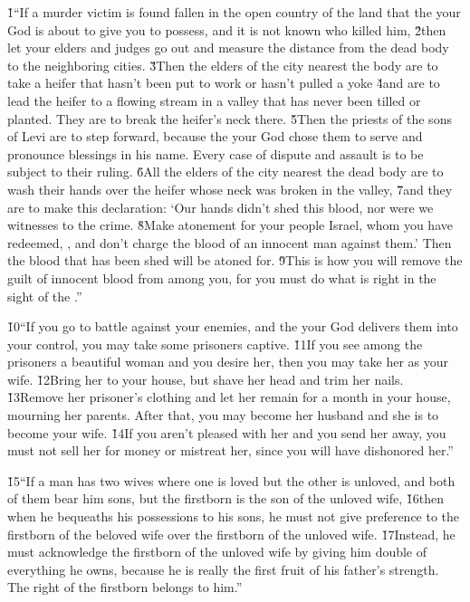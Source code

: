 \v{1}``If a murder victim is found fallen in the open country of the land that the  your God is about to give you to possess, and it is not known who killed him, \v{2}then let your elders and judges go out and measure the distance from the dead body to the neighboring cities. \v{3}Then the elders of the city nearest the body are to take a heifer that hasn't been put to work or hasn't pulled a yoke \v{4}and are to lead the heifer to a flowing stream in a valley that has never been tilled or planted. They are to break the heifer's neck there. \v{5}Then the priests of the sons of Levi are to step forward, because the  your God chose them to serve and pronounce blessings in his name. Every case of dispute and assault is to be subject to their ruling. \v{6}All the elders of the city nearest the dead body are to wash their hands over the heifer whose neck was broken in the valley, \v{7}and they are to make this declaration: `Our hands didn't shed this blood, nor were we witnesses to the crime. \v{8}Make atonement for your people Israel, whom you have redeemed, , and don't charge the blood of an innocent man against them.' Then the blood that has been shed will be atoned for. \v{9}This is how you will remove the guilt of innocent blood from among you, for you must do what is right in the sight of the .''

\v{10}``If you go to battle against your enemies, and the  your God delivers them into your control, you may take some prisoners captive. \v{11}If you see among the prisoners a beautiful woman and you desire her, then you may take her as your wife. \v{12}Bring her to your house, but shave her head and trim her nails. \v{13}Remove her prisoner's clothing and let her remain for a month in your house, mourning her parents. After that, you may become her husband and she is to become your wife. \v{14}If you aren't pleased with her and you send her away, you must not sell her for money or mistreat her, since you will have dishonored her.''

\v{15}``If a man has two wives where one is loved but the other is unloved, and both of them bear him sons, but the firstborn is the son of the unloved wife, \v{16}then when he bequeaths his possessions to his sons, he must not give preference to the firstborn of the beloved wife over the firstborn of the unloved wife. \v{17}Instead, he must acknowledge the firstborn of the unloved wife by giving him double of everything he owns, because he is really the first fruit of his father's strength. The right of the firstborn belongs to him.''

